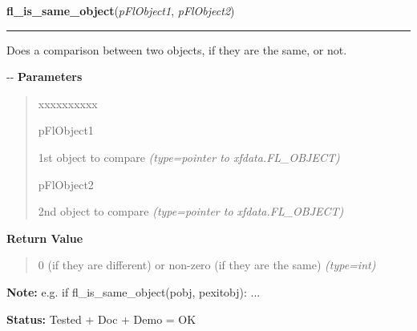 \hspace{.8\funcindent}\begin{boxedminipage}{\funcwidth}

    \raggedright \textbf{fl\_is\_same\_object}(\textit{pFlObject1}, \textit{pFlObject2})

    \vspace{-1.5ex}

    \rule{\textwidth}{0.5\fboxrule}
\setlength{\parskip}{2ex}

Does a comparison between two objects, if they are the same, or not.

-{}-
\setlength{\parskip}{1ex}
      \textbf{Parameters}
      \vspace{-1ex}

      \begin{quote}
        \begin{Ventry}{xxxxxxxxxx}

          \item[pFlObject1]


1st object to compare
            {\it (type=pointer to xfdata.FL\_OBJECT)}

          \item[pFlObject2]


2nd object to compare
            {\it (type=pointer to xfdata.FL\_OBJECT)}

        \end{Ventry}

      \end{quote}

      \textbf{Return Value}
    \vspace{-1ex}

      \begin{quote}

0 (if they are different) or non-zero (if they are the same)
      {\it (type=int)}

      \end{quote}

\textbf{Note:} 
e.g. if fl\_is\_same\_object(pobj, pexitobj): ...


\textbf{Status:} 
Tested + Doc + Demo = OK


    \end{boxedminipage}



